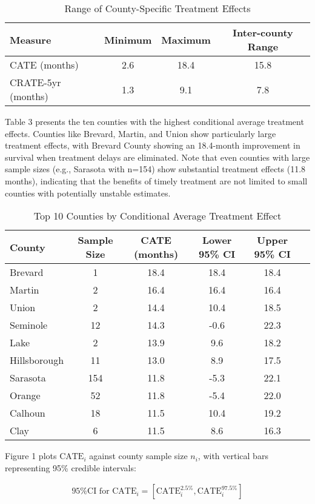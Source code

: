 \documentclass[useAMS,referee]{biom}
\begin{document}
\begin{table}[ht]
\centering
\caption{Range of County-Specific Treatment Effects}
\begin{tabular}{lccc}
\hline
Measure & Minimum & Maximum & Inter-county Range \\
\hline
CATE (months) & 2.6 & 18.4 & 15.8 \\
CRATE-5yr (months) & 1.3 & 9.1 & 7.8 \\
\hline
\end{tabular}
\end{table}

Table 3 presents the ten counties with the highest conditional average treatment effects. Counties like Brevard, Martin, and Union show particularly large treatment effects, with Brevard County showing an 18.4-month improvement in survival when treatment delays are eliminated. Note that even counties with large sample sizes (e.g., Sarasota with n=154) show substantial treatment effects (11.8 months), indicating that the benefits of timely treatment are not limited to small counties with potentially unstable estimates.

\begin{table}[ht]
\centering
\caption{Top 10 Counties by Conditional Average Treatment Effect}
\begin{tabular}{lccccc}
\hline
County & Sample Size & CATE (months) & Lower 95\% CI & Upper 95\% CI \\
\hline
Brevard & 1 & 18.4 & 18.4 & 18.4 \\
Martin & 2 & 16.4 & 16.4 & 16.4 \\
Union & 2 & 14.4 & 10.4 & 18.5 \\
Seminole & 12 & 14.3 & -0.6 & 22.3 \\
Lake & 2 & 13.9 & 9.6 & 18.2 \\
Hillsborough & 11 & 13.0 & 8.9 & 17.5 \\
Sarasota & 154 & 11.8 & -5.3 & 22.1 \\
Orange & 52 & 11.8 & -5.4 & 22.0 \\
Calhoun & 18 & 11.5 & 10.4 & 19.2 \\
Clay & 6 & 11.5 & 8.6 & 16.3 \\
\hline
\end{tabular}
\end{table}

Figure 1 plots $\text{CATE}_i$ against county sample size $n_i$, with vertical bars representing 95\% credible intervals:

\begin{align}
\text{95\% CI for CATE}_i = [\text{CATE}_i^{2.5\%}, \text{CATE}_i^{97.5\%}]
\end{align}
\end{document}
